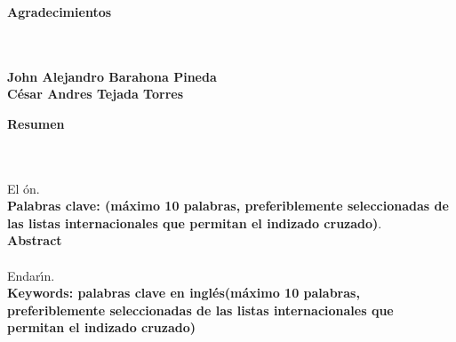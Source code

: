 \newpage{\pagestyle{empty}\cleardoublepage}

\newpage
\thispagestyle{empty} \textbf{}\normalsize
\\\\\\%
\textbf{\LARGE Agradecimientos}
\\\\

\textbf{John Alejandro Barahona Pineda}\\

\textbf{César Andres Tejada Torres}\\

\newpage{\pagestyle{empty}\cleardoublepage}

\newpage
\textbf{\LARGE Resumen}
\\\\
El \'{o}n.\\
\textbf{\small Palabras clave: (m\'{a}ximo 10 palabras, preferiblemente seleccionadas de las listas internacionales que permitan el indizado cruzado)}.\\[2.0cm]
\textbf{\LARGE Abstract}\\\\
Endar\'{\i}n.\\[2.0cm]
\textbf{\small Keywords: palabras clave en ingl\'{e}s(m\'{a}ximo 10 palabras, preferiblemente seleccionadas de las listas internacionales que permitan el indizado cruzado)}\\